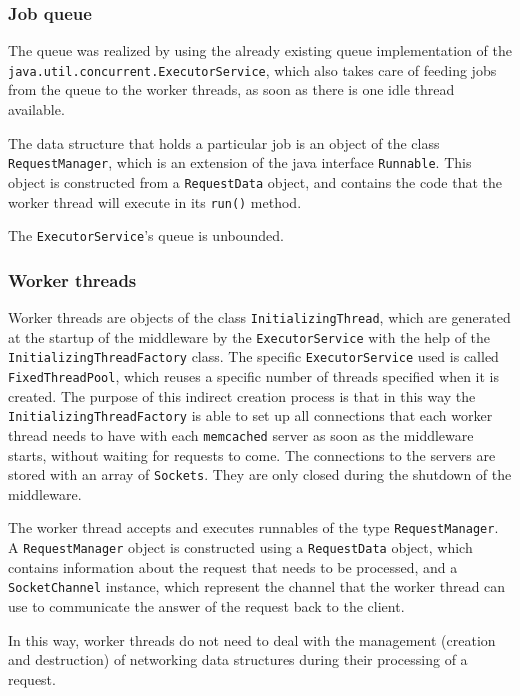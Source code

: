\documentclass[11pt,a4paper]{article}
\renewcommand{\t}[1]{%
	{\texttt{#1}}}
\begin{document}
\subsubsection{Job queue}

The queue was realized by using the already existing queue implementation of
the \\ \texttt{java.util.concurrent.ExecutorService}, which also takes care of feeding
jobs from the queue to the worker threads, as soon as there is one idle thread
available.

The data structure that holds a particular job is an object of the class
\t{RequestManager}, which is an extension of the java interface \t{Runnable}.
This object is constructed from a \t{RequestData} object, and contains the code
that the worker thread will execute in its \t{run()} method.

The \t{ExecutorService}'s queue is unbounded.

\subsubsection{Worker threads}

Worker threads are objects of the class \t{InitializingThread}, which are generated
at the startup of the middleware by the \t{ExecutorService} with the help of
the \t{InitializingThreadFactory} class. The specific \t{ExecutorService} used 
is called \t{FixedThreadPool}, which reuses a specific number of threads specified when it is created.
The purpose of this indirect creation process is that in this way the \t{InitializingThreadFactory}
is able to set up all connections that each worker thread needs to have with each \t{memcached} server as
soon as the middleware starts, without waiting for requests to come.
The connections to the servers are stored with an array of \t{Sockets}. They
are only closed during the shutdown of the middleware.

The worker thread accepts and executes runnables of the type \t{RequestManager}.
A \t{RequestManager} object is constructed using a \t{RequestData} object, which contains
information about the request that needs to be processed, and a \t{SocketChannel} instance,
which represent the channel that the worker thread can use to communicate the answer
of the request back to the client.

In this way, worker threads do not need to deal with the management (creation and destruction) of
networking data structures during their processing of a request. 
\vspace{1em}
\end{document}
